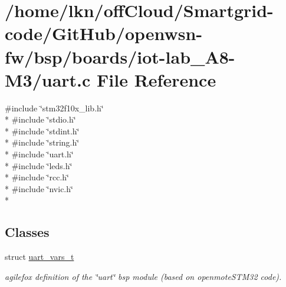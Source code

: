 \hypertarget{iot-lab___a8-_m3_2uart_8c}{}\section{/home/lkn/off\+Cloud/\+Smartgrid-\/code/\+Git\+Hub/openwsn-\/fw/bsp/boards/iot-\/lab\+\_\+\+A8-\/\+M3/uart.c File Reference}
\label{iot-lab___a8-_m3_2uart_8c}
{\ttfamily \#include \char`\"{}stm32f10x\+\_\+lib.\+h\char`\"{}}\\*
{\ttfamily \#include \char`\"{}stdio.\+h\char`\"{}}\\*
{\ttfamily \#include \char`\"{}stdint.\+h\char`\"{}}\\*
{\ttfamily \#include \char`\"{}string.\+h\char`\"{}}\\*
{\ttfamily \#include \char`\"{}uart.\+h\char`\"{}}\\*
{\ttfamily \#include \char`\"{}leds.\+h\char`\"{}}\\*
{\ttfamily \#include \char`\"{}rcc.\+h\char`\"{}}\\*
{\ttfamily \#include \char`\"{}nvic.\+h\char`\"{}}\\*
\subsection*{Classes}
\begin{DoxyCompactItemize}
\item 
struct \hyperlink{structuart__vars__t}{uart\+\_\+vars\+\_\+t}
\begin{DoxyCompactList}\small\item\em agilefox definition of the \char`\"{}uart\char`\"{} bsp module (based on openmote\+S\+T\+M32 code). \end{DoxyCompactList}\end{DoxyCompactItemize}
